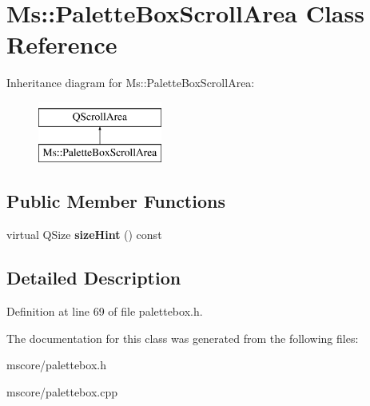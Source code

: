 \hypertarget{class_ms_1_1_palette_box_scroll_area}{}\section{Ms\+:\+:Palette\+Box\+Scroll\+Area Class Reference}
\label{class_ms_1_1_palette_box_scroll_area}
Inheritance diagram for Ms\+:\+:Palette\+Box\+Scroll\+Area\+:\begin{figure}[H]
\begin{center}
\leavevmode
\includegraphics[height=2.000000cm]{class_ms_1_1_palette_box_scroll_area}
\end{center}
\end{figure}
\subsection*{Public Member Functions}
\begin{DoxyCompactItemize}
\item 
\mbox{\label{class_ms_1_1_palette_box_scroll_area_a32985241b0dd85790bcde056b54abd99}} 
virtual Q\+Size {\bfseries size\+Hint} () const
\end{DoxyCompactItemize}


\subsection{Detailed Description}


Definition at line 69 of file palettebox.\+h.



The documentation for this class was generated from the following files\+:\begin{DoxyCompactItemize}
\item 
mscore/palettebox.\+h\item 
mscore/palettebox.\+cpp\end{DoxyCompactItemize}
